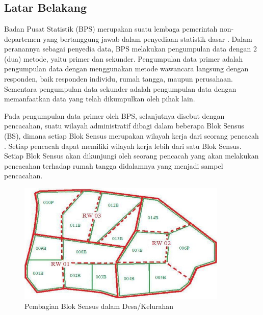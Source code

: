 \chapter{\babSatu}


\section{Latar Belakang}
Badan Pusat Statistik (BPS) merupakan suatu lembaga pemerintah non-departemen yang bertanggung jawab dalam penyediaan statistik dasar \citep{bps_badan_2016}. Dalam peranannya sebagai penyedia data, BPS melakukan pengumpulan data dengan 2 (dua) metode, yaitu primer dan sekunder. Pengumpulan data primer adalah pengumpulan data dengan menggunakan metode wawancara langsung dengan responden, baik responden individu, rumah tangga, maupun perusahaan. Sementara pengumpulan data sekunder adalah pengumpulan data dengan memanfaatkan data yang telah dikumpulkan oleh pihak lain.


Pada pengumpulan data primer oleh BPS, selanjutnya disebut dengan pencacahan, suatu wilayah administratif dibagi dalam beberapa Blok Sensus (BS), dimana setiap Blok Sensus merupakan wilayah kerja dari seorang pencacah \citep{bps_sistem_2016}. Setiap pencacah dapat memiliki wilayah kerja lebih dari satu Blok Sensus. Setiap Blok Sensus akan dikunjungi oleh seorang pencacah yang akan melakukan pencacahan terhadap rumah tangga didalamnya yang menjadi sampel pencacahan.


\begin{figure}[!]
    \centering
    \includegraphics[width=10cm]{Resources/Images/peta_kelurahan_per_bs}
    \caption{Pembagian Blok Sensus dalam Desa/Kelurahan}
    \label{fig:capi-ilustration}
\end{figure}


